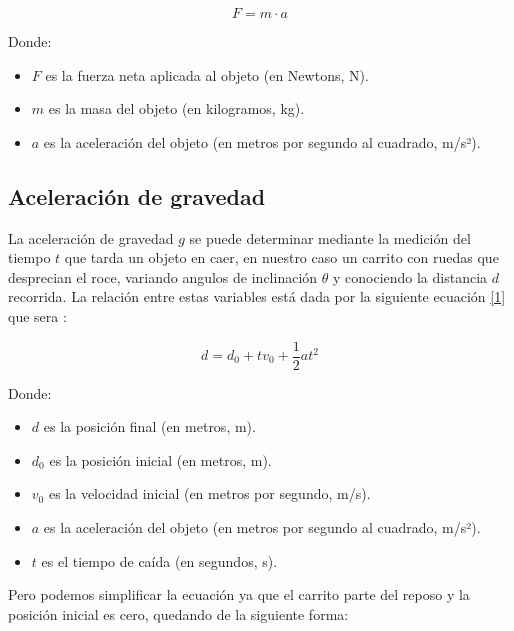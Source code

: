 \documentclass{article}
\begin{document}
\begin{multicols}{2}
            \begin{equation}
                F = m \cdot a
            \end{equation}

        Donde:
            \begin{itemize}
                \item $F$ es la fuerza neta aplicada al objeto (en Newtons, N).
                \item $m$ es la masa del objeto (en kilogramos, kg).
                \item $a$ es la aceleración del objeto (en metros por segundo al cuadrado, m/s²).
            \end{itemize}

    \subsection{Aceleración de gravedad}

        La aceleración de gravedad $g$ se puede determinar mediante la medición del tiempo $t$ que tarda 
        un objeto en caer, en nuestro caso un carrito con ruedas que desprecian el roce, variando angulos
        de inclinación $\theta$ y conociendo la distancia $d$ recorrida. La relación entre estas variables
        está dada por la siguiente ecuación \ref{1} que sera  :

            \begin{equation}
                d = d_0 + tv_0 + \frac{1}{2} a t^2
            \end{equation}

        Donde:

            \begin{itemize}
                \item $d$ es la posición final (en metros, m).
                \item $d_0$ es la posición inicial (en metros, m).
                \item $v_0$ es la velocidad inicial (en metros por segundo, m/s).
                \item $a$ es la aceleración del objeto (en metros por segundo al cuadrado, m/s²).
                \item $t$ es el tiempo de caída (en segundos, s).
            \end{itemize}

        Pero podemos simplificar la ecuación ya que el carrito parte del reposo y la posición inicial 
        es cero, quedando de la siguiente forma:
            

\end{multicols}
\end{document}
